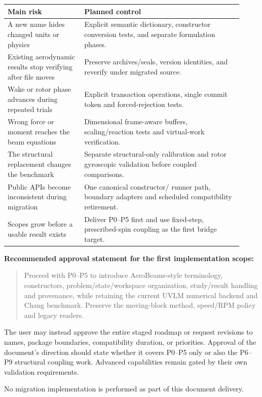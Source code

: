 \documentclass[11pt,a4paper]{article}
\begin{document}
\begin{longtable}{@{}L{0.30\linewidth}L{0.62\linewidth}@{}}
\toprule
Main risk & Planned control\\
\midrule\endhead
A new name hides changed units or physics & Explicit semantic dictionary,
constructor conversion tests, and separate formulation phases.\\
Existing aerodynamic results stop verifying after file moves & Preserve
archives/seals, version identities, and reverify under migrated source.\\
Wake or rotor phase advances during repeated trials & Explicit transaction
operations, single commit token and forced-rejection tests.\\
Wrong force or moment reaches the beam equations & Dimensional frame-aware
buffers, scaling/reaction tests and virtual-work verification.\\
The structural replacement changes the benchmark & Separate structural-only
calibration and rotor gyroscopic validation before coupled comparisons.\\
Public APIs become inconsistent during migration & One canonical constructor/
runner path, boundary adapters and scheduled compatibility retirement.\\
Scopes grow before a usable result exists & Deliver P0--P5 first and use
fixed-step, prescribed-spin coupling as the first bridge target.\\
\bottomrule
\end{longtable}

\textbf{Recommended approval statement for the first implementation scope:}

\begin{quote}
Proceed with P0--P5 to introduce AeroBeams-style terminology, constructors,
problem/state/workspace organization, study/result handling and provenance,
while retaining the current UVLM numerical backend and Chang benchmark.
Preserve the moving-block method, speed/RPM policy and legacy readers.
\end{quote}

The user may instead approve the entire staged roadmap or request revisions
to names, package boundaries, compatibility duration, or priorities. Approval
of the document's direction should state whether it covers P0--P5 only or
also the P6--P9 structural coupling work. Advanced capabilities remain gated
by their own validation requirements.

No migration implementation is performed as part of this document delivery.
\end{document}
